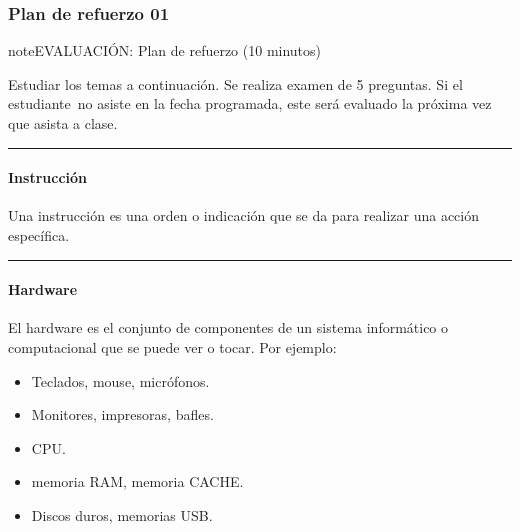 \documentclass[letterpaper,10pt,spanish]{sphinxmanual}
\begin{document}
\sphinxstepscope


\subsubsection{Plan de refuerzo 01}
\label{\detokenize{cursos/ofimatica11/periodo01/R01:plan-de-refuerzo-01}}\label{\detokenize{cursos/ofimatica11/periodo01/R01::doc}}
\begin{sphinxadmonition}{note}{EVALUACIÓN: Plan de refuerzo (10 minutos)}

\sphinxAtStartPar
Estudiar los temas a continuación. Se realiza examen de 5 preguntas. Si el estudiante no asiste en la fecha programada, este será evaluado la próxima vez que asista a clase.
\end{sphinxadmonition}


\bigskip\hrule\bigskip



\paragraph{Instrucción}
\label{\detokenize{cursos/ofimatica11/periodo01/R01:instruccion}}
\sphinxAtStartPar
Una instrucción es una orden o indicación que se da para realizar una acción específica.


\bigskip\hrule\bigskip



\paragraph{Hardware}
\label{\detokenize{cursos/ofimatica11/periodo01/R01:hardware}}
\sphinxAtStartPar
El hardware es el conjunto de componentes de un sistema informático o computacional que se puede ver o tocar. Por ejemplo:
\begin{itemize}
\item {} 
\sphinxAtStartPar
{} Teclados, mouse, micrófonos.

\item {} 
\sphinxAtStartPar
{} Monitores, impresoras, bafles.

\item {} 
\sphinxAtStartPar
{} CPU.

\item {} 
\sphinxAtStartPar
{} memoria RAM, memoria CACHE.

\item {} 
\sphinxAtStartPar
{} Discos duros, memorias USB.

\end{itemize}
\end{document}
